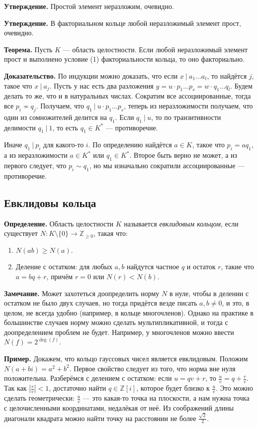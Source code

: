 \textbf{Утверждение.} Простой элемент неразложим, очевидно.

\textbf{Утверждение.} В факториальном кольце любой неразложимый элемент прост, очевидно.

\textbf{Теорема.} Пусть $K$ --- область целостности. Если любой неразложимый элемент прост и выполнено условие (1) факториальности кольца, то оно факториально.

\textbf{Доказательство.} По индукции можно доказать, что если $x~|~a_1 \dots a_t$, то найдётся $j$, такое что $x~|~a_j$.
Пусть у нас есть два разложения $y = u \cdot p_1 \dots p_s = w \cdot q_1 \dots q_l$.
Будем делать то же, что и в натуральных числах.
Сократим все ассоциированные, тогда все $p_i \not\sim q_j$.
Получаем, что $q_1~|~u \cdot p_1 \dots p_s$, теперь из неразложимости получаем, что один из сомножителей делится на $q_1$.
Если $q_1~|~u$, то по транзитивности делимости $q_1~|~1$, то есть $q_1 \in K^*$ --- противоречие.

Иначе $q_1~|~p_i$ для какого-то $i$.
По определению найдётся $a \in K$, такое что $p_i = a q_1$, а из неразложимости $a \in K^*$ или $q_1 \in K^*$.
Второе быть верно не может, а из первого следует, что $p_i \sim q_1$, но мы изначально сократили ассоциированные --- противоречие.

\QED

\subsection{Евклидовы кольца}
\textbf{Определение.} Область целостности $K$ называется \textit{евклидовым кольцом}, если существует $N: K \setminus \{0\} \to \mathbb Z_{\ge 0}$, такая что:
\begin{enumerate}
    \item $N(ab) \ge N(a)$.
    \item Деление с остатком: для любых $a, b$ найдутся частное $q$ и остаток $r$, такие что $a = bq + r$, причём $r = 0$ или $N(r) < N(b)$.
\end{enumerate}

\textbf{Замечание.} Может захотеться доопределить норму $N$ в нуле, чтобы в делении с остатком не было двух случаев, но тогда придётся везде писать $a, b \ne 0$, и это, в целом, не всегда удобно (например, в кольце многочленов).
Однако на практике в большинстве случаев норму можно сделать мультипликативной, и тогда с доопределением проблем не будет.
Например, у многочленов можно ввести $N(f) = 2^{\deg(f)}$.


\textbf{Пример.} Докажем, что кольцо гауссовых чисел является евклидовым.
Положим $N(a + bi) = a^2 + b^2$.
Первое свойство следует из того, что норма вне нуля положительна.
Разберёмся с делением с остатком: если $u = qv + r$, то $\frac{u}{v} = q + \frac{r}{v}$.
Так как $\left| \frac{r}{v} \right| < 1$, достаточно найти $q \in \mathbb Z[i]$, которое будет близко к $\frac{u}{v}$.
Это можно сделать геометрически: $\frac{u}{v}$ --- это какая-то точка на плоскости, а нам нужна точка с целочисленными координатами, недалёкая от неё.
Из соображений длины диагонали квадрата можно найти точку на расстоянии не более $\frac{\sqrt 2}{2}$.

